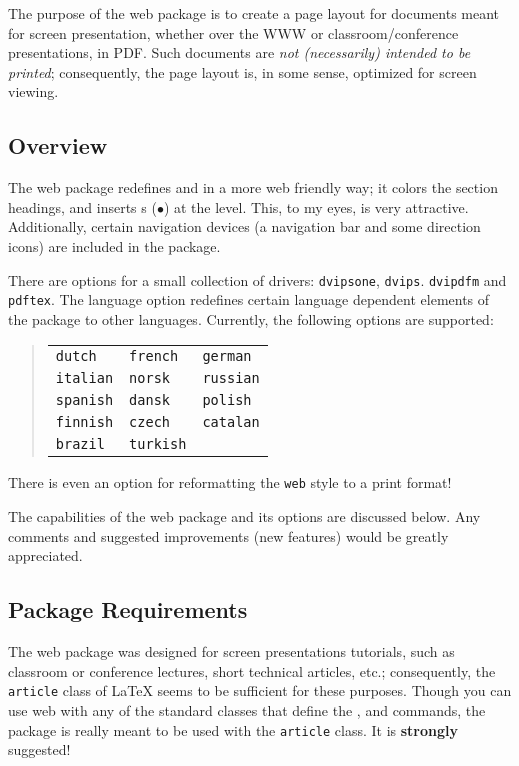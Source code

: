 \documentclass{article}
\let\pkg\textsf
\begin{document}
{The purpose of the \pkg{web} package is to create a page layout
for documents meant for screen presentation, whether over the
\textsf{WWW} or classroom/conference presentations, in
\textsf{PDF}. Such documents are \emph{not \emph{(necessarily)}
intended to be printed}; consequently, the page layout is, in some
sense, optimized for screen viewing.

\subsection{Overview}

The \pkg{web} package redefines  and
 in a more web friendly way; it colors the
section headings, and inserts s ($\bullet$) at the
 level.  This, to my eyes, is very attractive.
Additionally, certain navigation devices (a navigation bar and
some direction icons) are included in the package.

There are options for a small collection of drivers:
\texttt{dvipsone}, \texttt{dvips}. \texttt{dvipdfm} and \texttt{pdftex}.  The language
option redefines certain language dependent elements of the package
to other languages. Currently, the following options are supported:
\begin{quote}
\begin{tabular}{lll}
\texttt{dutch}   & \texttt{french} & \texttt{german}\\
\texttt{italian} & \texttt{norsk}  & \texttt{russian}\\
\texttt{spanish} & \texttt{dansk}  & \texttt{polish}\\
\texttt{finnish} & \texttt{czech}  & \texttt{catalan}\\
\texttt{brazil}  & \texttt{turkish}
\end{tabular}
\end{quote}

There is even an option for reformatting the \texttt{web}
style to a print format!

The capabilities of the \pkg{web} package and its options are
discussed below. Any comments and suggested improvements (new
features) would be greatly appreciated.

\subsection{Package Requirements}

The \pkg{web} package was designed for screen presentations
tutorials, such as classroom or conference lectures, short technical
articles, etc.; consequently, the \texttt{article} class of \LaTeX{}
seems to be sufficient for these purposes.  Though you can use
\pkg{web} with any of the standard classes that define the
,  and  commands, the
package is really meant to be used with the \texttt{article}
class.  It is \textbf{strongly} suggested!

}
\end{document}
